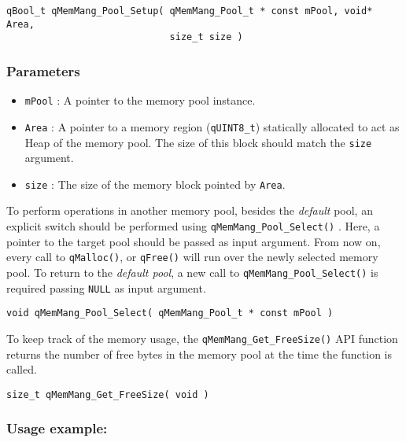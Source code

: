 \begin{lstlisting}[style=CStyle]
qBool_t qMemMang_Pool_Setup( qMemMang_Pool_t * const mPool, void* Area, 
                             size_t size )
\end{lstlisting}

\subsubsection*{Parameters}
\begin{itemize}
    \item \lstinline{mPool} : A pointer to the memory pool instance. 
    \item \lstinline{Area} :  A pointer to a memory region (\lstinline{qUINT8_t}) statically allocated to act as Heap of the memory pool. The size of this block should match the \lstinline{size} argument.
    \item \lstinline{size} : The size of the memory block pointed by \lstinline{Area}. 
\end{itemize}

To perform operations in another memory pool, besides the \textit{default} pool, an explicit switch should be performed using \lstinline{qMemMang_Pool_Select()} . Here, a pointer to the target pool should be passed as input argument.  From now on, every call to \lstinline{qMalloc()}, or \lstinline{qFree()} will run over the newly selected memory pool. To return to  the \textit{default pool},  a new call to  \lstinline{qMemMang_Pool_Select()} is required passing \lstinline{NULL} as input argument. 
\medskip

\begin{lstlisting}[style=CStyle]
void qMemMang_Pool_Select( qMemMang_Pool_t * const mPool )
\end{lstlisting}

To keep track of the memory usage, the \lstinline{qMemMang_Get_FreeSize()}  API function returns the number of free bytes in the memory pool at the time the function is called.
\medskip

\begin{lstlisting}[style=CStyle]
size_t qMemMang_Get_FreeSize( void )
\end{lstlisting}

\subsubsection*{Usage example:}


